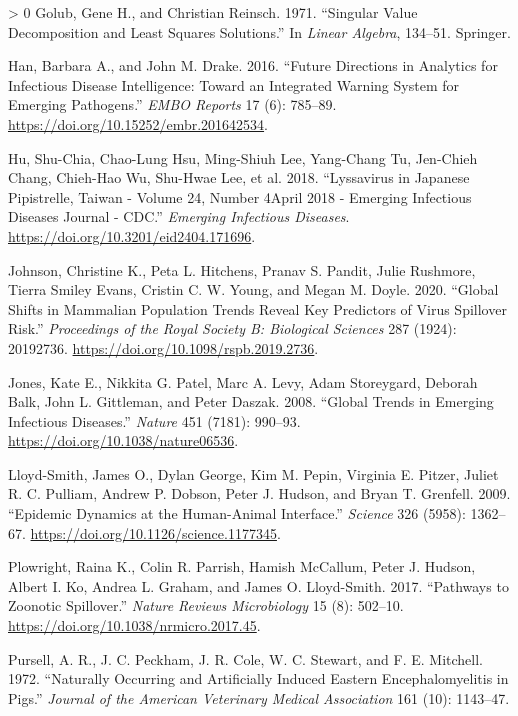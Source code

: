 \documentclass[11pt]{article}
\newlength{\cslhangindent}
\newenvironment{CSLReferences}[3] %
 {%
  \setlength{\parindent}{0pt}
  \ifodd #1 \everypar{\setlength{\hangindent}{\cslhangindent}}\ignorespaces\fi
  \ifnum #2 > 0
  \setlength{\parskip}{#2\baselineskip}
  \fi
 }%
 {}
\begin{document}
\begin{CSLReferences}{1}{0}
\leavevmode\hypertarget{ref-Golub1971SinVal}{}%
Golub, Gene H., and Christian Reinsch. 1971. {``Singular Value
Decomposition and Least Squares Solutions.''} In \emph{Linear Algebra},
134--51. Springer.

\leavevmode\hypertarget{ref-Han2016FutDir}{}%
Han, Barbara A., and John M. Drake. 2016. {``Future Directions in
Analytics for Infectious Disease Intelligence: Toward an Integrated
Warning System for Emerging Pathogens.''} \emph{EMBO Reports} 17 (6):
785--89. \url{https://doi.org/10.15252/embr.201642534}.

\leavevmode\hypertarget{ref-Hu2018LysJap}{}%
Hu, Shu-Chia, Chao-Lung Hsu, Ming-Shiuh Lee, Yang-Chang Tu, Jen-Chieh
Chang, Chieh-Hao Wu, Shu-Hwae Lee, et al. 2018. {``Lyssavirus in
Japanese Pipistrelle, Taiwan - Volume 24, Number 4April 2018 - Emerging
Infectious Diseases Journal - CDC.''} \emph{Emerging Infectious
Diseases}. \url{https://doi.org/10.3201/eid2404.171696}.

\leavevmode\hypertarget{ref-Johnson2020GloShi}{}%
Johnson, Christine K., Peta L. Hitchens, Pranav S. Pandit, Julie
Rushmore, Tierra Smiley Evans, Cristin C. W. Young, and Megan M. Doyle.
2020. {``Global Shifts in Mammalian Population Trends Reveal Key
Predictors of Virus Spillover Risk.''} \emph{Proceedings of the Royal
Society B: Biological Sciences} 287 (1924): 20192736.
\url{https://doi.org/10.1098/rspb.2019.2736}.

\leavevmode\hypertarget{ref-Jones2008GloTre}{}%
Jones, Kate E., Nikkita G. Patel, Marc A. Levy, Adam Storeygard, Deborah
Balk, John L. Gittleman, and Peter Daszak. 2008. {``Global Trends in
Emerging Infectious Diseases.''} \emph{Nature} 451 (7181): 990--93.
\url{https://doi.org/10.1038/nature06536}.

\leavevmode\hypertarget{ref-Lloyd-Smith2009EpiDyn}{}%
Lloyd-Smith, James O., Dylan George, Kim M. Pepin, Virginia E. Pitzer,
Juliet R. C. Pulliam, Andrew P. Dobson, Peter J. Hudson, and Bryan T.
Grenfell. 2009. {``Epidemic Dynamics at the Human-Animal Interface.''}
\emph{Science} 326 (5958): 1362--67.
\url{https://doi.org/10.1126/science.1177345}.

\leavevmode\hypertarget{ref-Plowright2017PatZoo}{}%
Plowright, Raina K., Colin R. Parrish, Hamish McCallum, Peter J. Hudson,
Albert I. Ko, Andrea L. Graham, and James O. Lloyd-Smith. 2017.
{``Pathways to Zoonotic Spillover.''} \emph{Nature Reviews Microbiology}
15 (8): 502--10. \url{https://doi.org/10.1038/nrmicro.2017.45}.

\leavevmode\hypertarget{ref-Pursell1972NatOcc}{}%
Pursell, A. R., J. C. Peckham, J. R. Cole, W. C. Stewart, and F. E.
Mitchell. 1972. {``Naturally Occurring and Artificially Induced Eastern
Encephalomyelitis in Pigs.''} \emph{Journal of the American Veterinary
Medical Association} 161 (10): 1143--47.


\end{CSLReferences}
\end{document}
